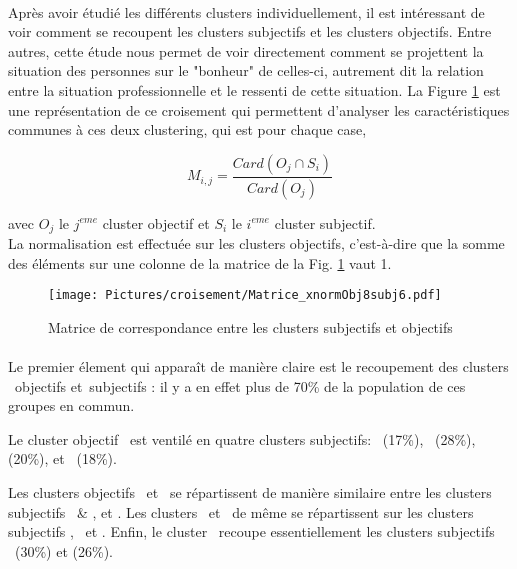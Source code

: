 \documentclass[11pt,fleqn,a4paper,openany,frenchb]{book} %
\begin{document}
\paragraph{}
Après avoir étudié les différents clusters individuellement, il est intéressant de voir comment se recoupent les clusters subjectifs et les clusters objectifs. Entre autres, cette étude nous permet de voir directement comment se projettent la situation des personnes sur le "bonheur" de celles-ci, autrement dit la relation entre la situation professionnelle et le ressenti de cette situation. La Figure \ref{fig:objxsubj} est une représentation de ce croisement qui permettent d'analyser les caractéristiques communes à ces deux clustering, qui est pour chaque case, 

$$M_{i,j} = \frac{Card(O_j \cap S_i)}{Card(O_j)}$$

avec $O_j$ le $j^{eme}$ cluster objectif et $S_i$ le $i^{eme}$ cluster subjectif. \\

La normalisation est effectuée sur les clusters objectifs, c'est-à-dire que la somme des éléments sur une colonne de la matrice de la Fig. \ref{fig:objxsubj} vaut 1.

\begin{figure}[!h]
\center
\texttt{[image: Pictures/croisement/Matrice\_xnormObj8subj6.pdf]}
\caption{Matrice de correspondance entre les clusters subjectifs et objectifs}
\label{fig:objxsubj}
\end{figure} %

\paragraph{}
Le premier élement qui apparaît de manière claire est le recoupement des clusters \INDEP\ objectifs et\INDEP\ subjectifs : il y a en effet plus de 70\% de la population de ces groupes en commun. 

Le cluster objectif \SERV\ est ventilé en quatre clusters subjectifs: \INDEP\ (17\%), \HEUR\ (28\%), \RAS (20\%), et \ENV\ (18\%). 

Les clusters objectifs \OUVR\ et \IMM\ se répartissent de manière similaire entre les clusters subjectifs \HEUR\ \& \RAS, et \ENV. Les clusters \CSPPPr\ et \CSPPPu\ de même se  répartissent sur les clusters subjectifs \RAS, \GLOB\ et \ENV. Enfin, le cluster \ACC\  recoupe 
essentiellement les clusters subjectifs \MALH\ (30\%) et \ENV (26\%).
\end{document}
